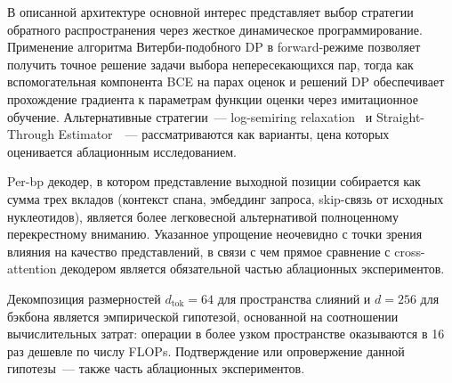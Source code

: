 В описанной архитектуре основной интерес представляет выбор стратегии
обратного распространения через жесткое динамическое программирование.
Применение алгоритма Витерби-подобного DP в forward-режиме позволяет
получить точное решение задачи выбора непересекающихся пар, тогда как
вспомогательная компонента BCE на парах оценок и решений DP
обеспечивает прохождение градиента к параметрам функции оценки через
имитационное обучение. Альтернативные стратегии~--- log-semiring
relaxation~\cite{menschDifferentiableDynamicProgramming2018} и
Straight-Through Estimator~\cite{bengioEstimatingPropagatingGradients2013}~---
рассматриваются как варианты, цена которых оценивается аблационным
исследованием.

Per-bp декодер, в котором представление выходной позиции собирается
как сумма трех вкладов (контекст спана, эмбеддинг запроса, skip-связь
от исходных нуклеотидов), является более легковесной альтернативой
полноценному перекрестному вниманию. Указанное упрощение неочевидно с
точки зрения влияния на качество представлений, в связи с чем прямое
сравнение с cross-attention декодером является обязательной частью
аблационных экспериментов.

Декомпозиция размерностей $d_{\text{tok}} = 64$ для пространства
слияний и $d = 256$ для бэкбона является эмпирической гипотезой,
основанной на соотношении вычислительных затрат: операции в более
узком пространстве оказываются в 16 раз дешевле по числу FLOPs.
Подтверждение или опровержение данной гипотезы~--- также часть
аблационных экспериментов.
